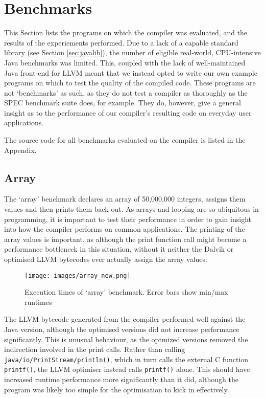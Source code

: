 \section{Benchmarks}
\label{sec:benchmarks}

This Section lists the programs on which the compiler was evaluated, and the results of the experiements performed. Due to a lack of a capable standard library (see Section \ref{sec:javalib}), the number of eligible real-world, CPU-intensive Java benchmarks was limited. This, coupled with the lack of well-maintained Java front-end for LLVM meant that we instead opted to write our own example programs on which to test the quality of the compiled code. These programs are not `benchmarks' as such, as they do not test a compiler as thoroughly as the SPEC benchmark suite does, for example. They do, however, give a general insight as to the performance of our compiler's resulting code on everyday user applications.

The source code for all benchmarks evaluated on the compiler is listed in the Appendix.

\subsection*{Array}

The `array' benchmark declares an array of 50,000,000 integers, assigns them values and then prints them back out. As arrays and looping are so ubiquitous in programming, it is important to test their performance in order to gain insight into how the compiler performs on common applications. The printing of the array values is important, as although the print function call might become a performance bottleneck in this situation, without it neither the Dalvik or optimised LLVM bytecodes ever actually assign the array values.

\begin{figure}[h!]
    \centering
    \texttt{[image: images/array\_new.png]}
    \caption[Execution times of `array' benchmark]{Execution times of `array' benchmark. Error bars show min/max runtimes}
    \label{fig:res_array}
\end{figure}

The LLVM bytecode generated from the compiler performed well against the Java version, although the optimised versions did not increase performance significantly. This is unusual behaviour, as the optmized versions removed the indirection involved in the print calls. Rather than calling \verb|java/io/PrintStream/println()|, which in turn calls the external C function \verb|printf()|, the LLVM optimiser instead calls \verb|printf()| alone. This should have increased runtime performance more significantly than it did, although the program was likely too simple for the optimisation to kick in effectively.

